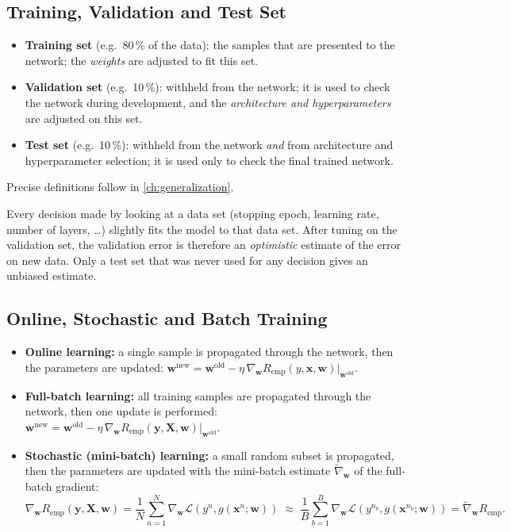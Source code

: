 \documentclass[11pt, oneside]{book}
\newcommand{\grad}{\nabla}               %
\newcommand{\loss}{\mathcal{L}}          %
\newcommand{\params}{\boldsymbol{\theta}}   %
\newcommand{\bx}{\bm{x}}        \newcommand{\by}{\bm{y}}
\newcommand{\bw}{\bm{w}}        \newcommand{\bW}{\bm{W}}
\newcommand{\bX}{\bm{X}}        \newcommand{\bY}{\bm{Y}}
\newcommand{\Remp}{R_{\mathrm{emp}}}     %
\let\originalsubsection\subsection
\renewcommand{\subsection}{\Needspace{6\baselineskip}\originalsubsection}
\begin{document}
\subsection{Training, Validation and Test Set}

\begin{defbox}[title={Training, validation and test set (``sloppy'' definitions)}]
\begin{itemize}
  \item \textbf{Training set} (e.g.\ 80\,\% of the data): the samples that
    are presented to the network; the \emph{weights} are adjusted to fit
    this set.
  \item \textbf{Validation set} (e.g.\ 10\,\%): withheld from the network; it
    is used to check the network during development, and the
    \emph{architecture and hyperparameters} are adjusted on this set.
  \item \textbf{Test set} (e.g.\ 10\,\%): withheld from the network
    \emph{and} from architecture and hyperparameter selection; it is used
    only to check the final trained network.
\end{itemize}
Precise definitions follow in \cref{ch:generalization}.
\end{defbox}

\begin{notebox}[title={Why a separate test set?}]
Every decision made by looking at a data set (stopping epoch, learning
rate, number of layers, \ldots) slightly fits the model to that data set.
After tuning on the validation set, the validation error is therefore an
\emph{optimistic} estimate of the error on new data. Only a test set that
was never used for any decision gives an unbiased estimate.
\end{notebox}

\subsection{Online, Stochastic and Batch Training}

\begin{itemize}
  \item \textbf{Online learning:} a single sample is propagated through the
    network, then the parameters are updated:
    $\bw^{\text{new}} = \bw^{\text{old}} - \eta\,\grad_{\bw}\Remp(y, \bx, \bw)|_{\bw^{\text{old}}}$.
  \item \textbf{Full-batch learning:} all training samples are propagated
    through the network, then one update is performed:
    $\bw^{\text{new}} = \bw^{\text{old}} - \eta\,\grad_{\bw}\Remp(\by, \bX, \bw)|_{\bw^{\text{old}}}$.
  \item \textbf{Stochastic (mini-batch) learning:} a small random subset is
    propagated, then the parameters are updated with the mini-batch estimate
    $\tilde\grad_{\bw}$ of the full-batch gradient:
    \[
      \grad_{\bw}\Remp(\by, \bX, \bw)
      = \frac1N\sum_{n=1}^{N}\grad_{\bw}\loss(y^n, g(\bx^n; \bw))
      \;\approx\;
      \frac1B\sum_{b=1}^{B}\grad_{\bw}\loss(y^{n_b}, g(\bx^{n_b}; \bw))
      = \tilde\grad_{\bw}\Remp .
    \]
\end{itemize}
\end{document}
